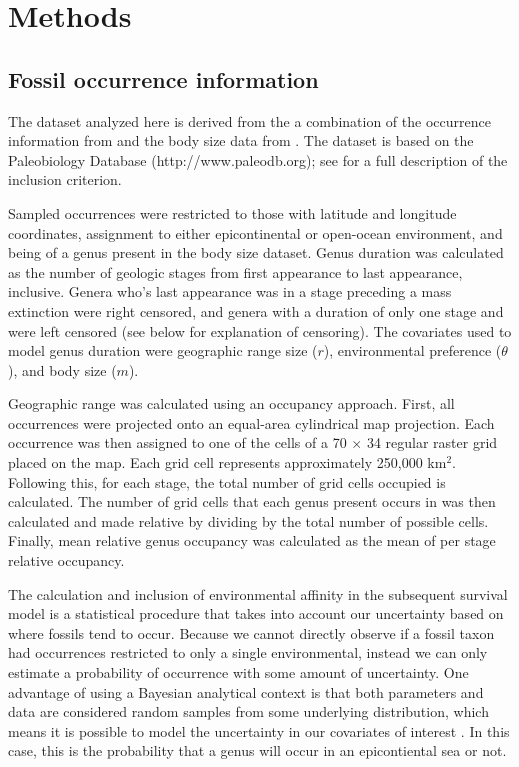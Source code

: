 \documentclass[12pt,letterpaper]{article}
\begin{document}
\section{Methods}

\subsection{Fossil occurrence information}

The dataset analyzed here is derived from the a combination of the occurrence information from \citet{Miller2009a} and the body size data from \citet{Payne2014}. The \citet{Miller2009a} dataset is based on the Paleobiology Database (http://www.paleodb.org); see \citet{Miller2009a} for a full description of the inclusion criterion. 

Sampled occurrences were restricted to those with latitude and longitude coordinates, assignment to either epicontinental or open-ocean environment, and being of a genus present in the body size dataset. Genus duration was calculated as the number of geologic stages from first appearance to last appearance, inclusive. Genera who's last appearance was in a stage preceding a mass extinction were right censored, and genera with a duration of only one stage and were left censored (see below for explanation of censoring). The covariates used to model genus duration were geographic range size (\(r\)), environmental preference (\(\theta\)), and body size (\(m\)). 

Geographic range was calculated using an occupancy approach. First, all occurrences were projected onto an equal-area cylindrical map projection. Each occurrence was then assigned to one of the cells of a 70 \(\times\) 34 regular raster grid placed on the map. Each grid cell represents approximately 250,000 km\(^{2}\). Following this, for each stage, the total number of grid cells occupied is calculated. The number of grid cells that each genus present occurs in was then calculated and made relative by dividing by the total number of possible cells. Finally, mean relative genus occupancy was calculated as the mean of per stage relative occupancy.

The calculation and inclusion of environmental affinity in the subsequent survival model is a statistical procedure that takes into account our uncertainty based on where fossils tend to occur. Because we cannot directly observe if a fossil taxon had occurrences restricted to only a single environmental, instead we can only estimate a probability of occurrence with some amount of uncertainty. One advantage of using a Bayesian analytical context is that both parameters and data are considered random samples from some underlying distribution, which means it is possible to model the uncertainty in our covariates of interest \citep{Gelman2013d}. In this case, this is the probability that a genus will occur in an epicontiental sea or not. 
\end{document}

